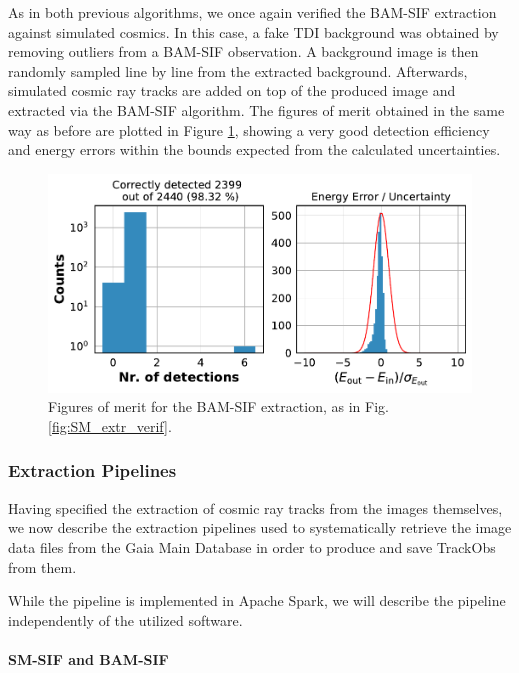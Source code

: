 \documentclass[a4paper, 11pt]{article}
\begin{document}
As in both previous algorithms, we once again verified the BAM-SIF extraction against simulated cosmics. In this case, a fake TDI background was obtained by removing outliers from a BAM-SIF observation. A background image is then randomly sampled line by line from the extracted background. Afterwards, simulated cosmic ray tracks are added on top of the produced image and extracted via the BAM-SIF algorithm. The figures of merit obtained in the same way as before are plotted in Figure \ref{fig:BAM-SIF_extr_verif}, showing a very good detection efficiency and energy errors within the bounds expected from the calculated uncertainties.
\begin{figure}
  \centering
    \includegraphics[width=\textwidth]{images/extraction/verification_bam-sif}
    \caption{Figures of merit for the BAM-SIF extraction, as in Fig. \ref{fig:SM_extr_verif}.}
  \label{fig:BAM-SIF_extr_verif}
\end{figure}


\subsubsection{Extraction Pipelines}

Having specified the extraction of cosmic ray tracks from the images themselves, we now describe the  extraction pipelines used to systematically retrieve the image data files from the Gaia Main Database in order to produce and save TrackObs from them.

While the pipeline is implemented in Apache Spark, we will describe the pipeline independently of the utilized software.

\paragraph{SM-SIF and BAM-SIF\\}
\end{document}
